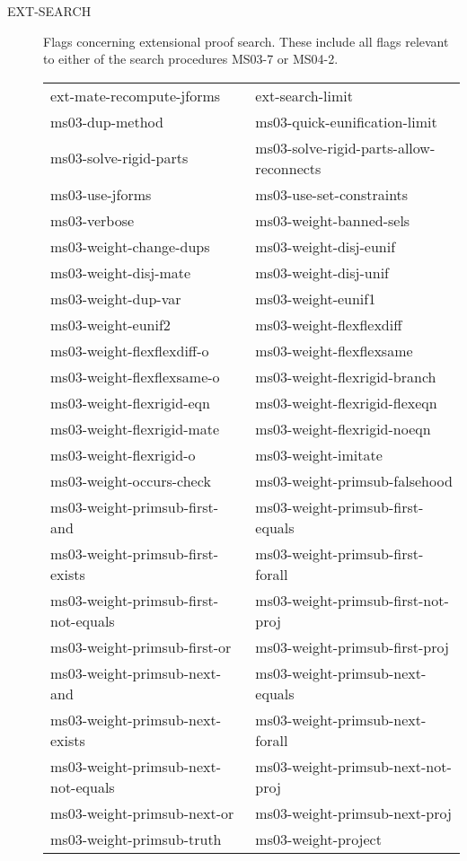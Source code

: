 \begin{description} 
\item[EXT-SEARCH]  
Flags concerning extensional proof search.  These include all flags
relevant to either of the search procedures MS03-7 or MS04-2.

\begin{tabular}{l l}
ext-mate-recompute-jforms&ext-search-limit\\
ms03-dup-method&ms03-quick-eunification-limit\\
ms03-solve-rigid-parts&ms03-solve-rigid-parts-allow-reconnects\\
ms03-use-jforms&ms03-use-set-constraints\\
ms03-verbose&ms03-weight-banned-sels\\
ms03-weight-change-dups&ms03-weight-disj-eunif\\
ms03-weight-disj-mate&ms03-weight-disj-unif\\
ms03-weight-dup-var&ms03-weight-eunif1\\
ms03-weight-eunif2&ms03-weight-flexflexdiff\\
ms03-weight-flexflexdiff-o&ms03-weight-flexflexsame\\
ms03-weight-flexflexsame-o&ms03-weight-flexrigid-branch\\
ms03-weight-flexrigid-eqn&ms03-weight-flexrigid-flexeqn\\
ms03-weight-flexrigid-mate&ms03-weight-flexrigid-noeqn\\
ms03-weight-flexrigid-o&ms03-weight-imitate\\
ms03-weight-occurs-check&ms03-weight-primsub-falsehood\\
ms03-weight-primsub-first-and&ms03-weight-primsub-first-equals\\
ms03-weight-primsub-first-exists&ms03-weight-primsub-first-forall\\
ms03-weight-primsub-first-not-equals&ms03-weight-primsub-first-not-proj\\
ms03-weight-primsub-first-or&ms03-weight-primsub-first-proj\\
ms03-weight-primsub-next-and&ms03-weight-primsub-next-equals\\
ms03-weight-primsub-next-exists&ms03-weight-primsub-next-forall\\
ms03-weight-primsub-next-not-equals&ms03-weight-primsub-next-not-proj\\
ms03-weight-primsub-next-or&ms03-weight-primsub-next-proj\\
ms03-weight-primsub-truth&ms03-weight-project\\

\end{tabular}
\end{description}
